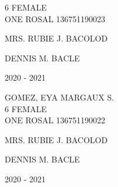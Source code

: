 \documentclass{article}
\begin{document}
{{\begin{multicols}{2}
\phantom{Age} \hspace*{8em} 6  \phantom{Sex} \hspace*{12em} FEMALE \\[2.5mm] %
\phantom{Grade} \hspace*{3em} ONE \phantom{Section} \hspace*{4em} ROSAL \phantom{LRN} \hspace*{4em} 136751190023 \\
\vspace*{25mm}
\begin{flushright}
MRS. RUBIE J. BACOLOD \hspace*{-1.5em}
\end{flushright}  
\vspace*{1.5mm}
\hspace*{3em} DENNIS M. BACLE
\end{multicols} 
\newpage
\begin{multicols}{2}
\phantom{u}
\columnbreak
\vspace*{-3mm}
\begin{center}
\phantom{school year:} \hspace*{6em} 2020 - 2021 
\end{center} 
\vspace{4mm} 
\phantom{Name:} \hspace*{5em} GOMEZ, EYA MARGAUX S. \\[2.5mm] %
\phantom{Age} \hspace*{8em} 6  \phantom{Sex} \hspace*{12em} FEMALE \\[2.5mm] %
\phantom{Grade} \hspace*{3em} ONE \phantom{Section} \hspace*{4em} ROSAL \phantom{LRN} \hspace*{4em} 136751190022 \\
\vspace*{25mm}
\begin{flushright}
MRS. RUBIE J. BACOLOD \hspace*{-1.5em}
\end{flushright}  
\vspace*{1.5mm}
\hspace*{3em} DENNIS M. BACLE
\end{multicols} 
\newpage
\begin{multicols}{2}
\phantom{u}
\columnbreak
\vspace*{-3mm}
\begin{center}
\phantom{school year:} \hspace*{6em} 2020 - 2021 

\end{center}
\end{multicols}}}
\end{document}
